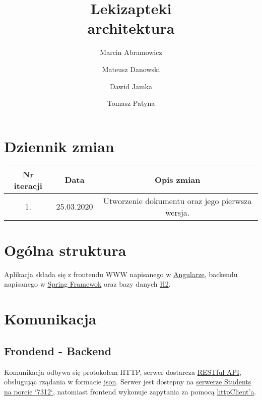 \documentclass{article}
\title{
Lekizapteki\\
\large architektura}
\author{Marcin Abramowicz \and Mateusz Danowski \and Dawid Jamka \and Tomasz Patyna}
\begin{document}
  \maketitle

  \section{Dziennik zmian}
  \begin{tabular}{|c|c|c|}
    Nr iteracji & Data & Opis zmian \\
    \hline
    1. & 25.03.2020 & Utworzenie dokumentu oraz jego pierwsza wersja. \\
  \end{tabular}

  \section{Ogólna struktura}
  Aplikacja składa się z frontendu WWW napisanego w
  \href{https://angular.io}{Angularze}, backendu napisanego w
  \href{https://spring.io}{Spring Framewok} oraz bazy danych
  \href {https://spring.io}{H2}.

  \section{Komunikacja}
  \subsection{Frondend - Backend}
  Komunikacja odbywa się protokołem HTTP, serwer dostarcza
  \href{https://en.wikipedia.org/wiki/Representational_state_transfer}{RESTful API},
  obsługując rządania w formacie
  \href{https://en.wikipedia.org/wiki/JSON}{json}.
  Serwer jest dostepny na
  \href{http://students.mimuw.edu.pl:7312}{serwerze Students na porcie `7312`},
  natomiast frontend wykonuje zapytania za pomocą
  \href{https://angular.io/guide/http}{httpClient'a}.
\end{document}
